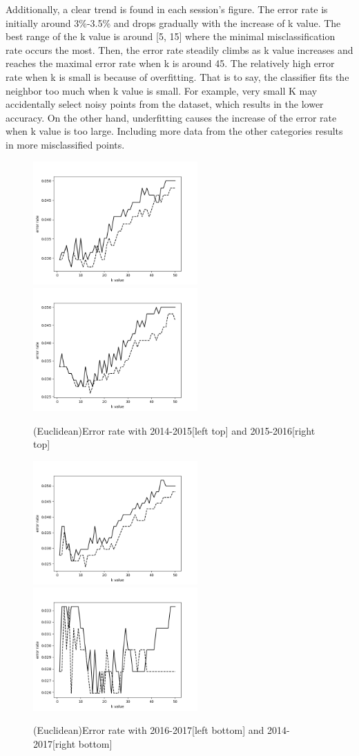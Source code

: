 \documentclass{article}
\begin{document}
Additionally, a clear trend is found in each session’s figure. The error rate is initially around 3\%-3.5\% and drops gradually with the increase of k value. The best range of the k value is around [5, 15] where the minimal misclassification rate occurs the most. Then, the error rate steadily climbs as k value increases and reaches the maximal error rate when k is around 45. The relatively high error rate when k is small is because of overfitting. That is to say, the classifier fits the neighbor too much when k value is small. For example, very small K may accidentally select noisy points from the dataset, which results in the lower accuracy. On the other hand, underfitting causes the increase of the error rate when k value is too large. Including more data from the other categories results in more misclassified points. 

\begin{figure}[hbt!]
  \centering
  \includegraphics[width=6.3cm]{knn_err14.png}
  \includegraphics[width=6.3cm]{knn_err15.png}
  \caption{(Euclidean)Error rate with 2014-2015[left top] and 2015-2016[right top]
  }
  \includegraphics[width=6.3cm]{knn_err16.png}
  \includegraphics[width=6.3cm]{knn_errall.png}
  \caption{(Euclidean)Error rate with 2016-2017[left bottom] and 2014-2017[right bottom]}
\end{figure}
\end{document}
